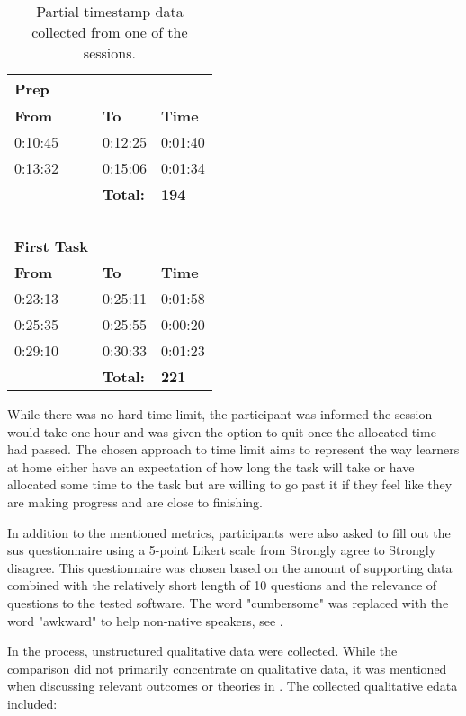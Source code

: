 \begin{table}[!ht]
    \centering
    \caption{Partial timestamp data collected from one of the sessions.}
    \label{table:timestamps}
    \begin{tabular}{|l l|l|}
        \hline
        \textbf{Prep} & & \\ \hline
        \textbf{From} & \textbf{To} & \textbf{Time} \\ \hline
        0:10:45 & 0:12:25 & 0:01:40 \\ \hline
        0:13:32 & 0:15:06 & 0:01:34 \\ \hline
        ~ & \textbf{Total:} & \textbf{194} \\ \hline
        ~ & ~ & ~ \\ \hline
        \textbf{First Task} & ~ & ~ \\ \hline
        \textbf{From} & \textbf{To} & \textbf{Time} \\ \hline
        0:23:13 & 0:25:11 & 0:01:58 \\ \hline
        0:25:35 & 0:25:55 & 0:00:20 \\ \hline
        0:29:10 & 0:30:33 & 0:01:23 \\ \hline
        ~ & \textbf{Total:} & \textbf{221} \\ \hline
    \end{tabular}
\end{table}

While there was no hard time limit, the participant was informed the session would take one hour and was given the option to quit once the allocated time had passed.
The chosen approach to time limit aims to represent the way learners at home either have an expectation of how long the task will take or have allocated some time to the task but are willing to go past it if they feel like they are making progress and are close to finishing.

In addition to the mentioned metrics, participants were also asked to fill out the \gls{sus} \parencite{brooke_sus_1996} questionnaire using a 5-point Likert scale from Strongly agree to Strongly disagree.
This questionnaire was chosen based on the amount of supporting data combined with the relatively short length of 10 questions and the relevance of questions to the tested software.
The word "cumbersome" was replaced with the word "awkward" to help non-native speakers, see .

In the process, unstructured qualitative data were collected.
While the comparison did not primarily concentrate on qualitative data, it was mentioned when discussing relevant outcomes or theories in .
The collected qualitative edata included:


